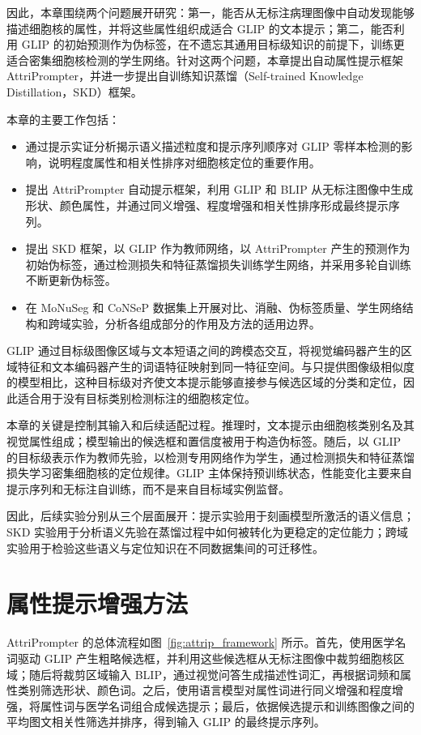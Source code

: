因此，本章围绕两个问题展开研究：第一，能否从无标注病理图像中自动发现能够描述细胞核的属性，并将这些属性组织成适合 GLIP 的文本提示；第二，能否利用 GLIP 的初始预测作为伪标签，在不遗忘其通用目标级知识的前提下，训练更适合密集细胞核检测的学生网络。针对这两个问题，本章提出自动属性提示框架 AttriPrompter，并进一步提出自训练知识蒸馏（Self-trained Knowledge Distillation，SKD）框架。

本章的主要工作包括：
\begin{itemize}
  \item 通过提示实证分析揭示语义描述粒度和提示序列顺序对 GLIP 零样本检测的影响，说明程度属性和相关性排序对细胞核定位的重要作用。
  \item 提出 AttriPrompter 自动提示框架，利用 GLIP 和 BLIP 从无标注图像中生成形状、颜色属性，并通过同义增强、程度增强和相关性排序形成最终提示序列。
  \item 提出 SKD 框架，以 GLIP 作为教师网络，以 AttriPrompter 产生的预测作为初始伪标签，通过检测损失和特征蒸馏损失训练学生网络，并采用多轮自训练不断更新伪标签。
  \item 在 MoNuSeg 和 CoNSeP 数据集上开展对比、消融、伪标签质量、学生网络结构和跨域实验，分析各组成部分的作用及方法的适用边界。


\end{itemize}
  GLIP 通过目标级图像区域与文本短语之间的跨模态交互，将视觉编码器产生的区域特征和文本编码器产生的词语特征映射到同一特征空间。与只提供图像级相似度的模型相比，这种目标级对齐使文本提示能够直接参与候选区域的分类和定位，因此适合用于没有目标类别检测标注的细胞核定位。

本章的关键是控制其输入和后续适配过程。推理时，文本提示由细胞核类别名及其视觉属性组成；模型输出的候选框和置信度被用于构造伪标签。随后，以 GLIP 的目标级表示作为教师先验，以检测专用网络作为学生，通过检测损失和特征蒸馏损失学习密集细胞核的定位规律。GLIP 主体保持预训练状态，性能变化主要来自提示序列和无标注自训练，而不是来自目标域实例监督。

因此，后续实验分别从三个层面展开：提示实验用于刻画模型所激活的语义信息；SKD 实验用于分析语义先验在蒸馏过程中如何被转化为更稳定的定位能力；跨域实验用于检验这些语义与定位知识在不同数据集间的可迁移性。

\section{属性提示增强方法}

AttriPrompter 的总体流程如图~\ref{fig:attrip_framework} 所示。首先，使用医学名词驱动 GLIP 产生粗略候选框，并利用这些候选框从无标注图像中裁剪细胞核区域；随后将裁剪区域输入 BLIP，通过视觉问答生成描述性词汇，再根据词频和属性类别筛选形状、颜色词。之后，使用语言模型对属性词进行同义增强和程度增强，将属性词与医学名词组合成候选提示；最后，依据候选提示和训练图像之间的平均图文相关性筛选并排序，得到输入 GLIP 的最终提示序列。

